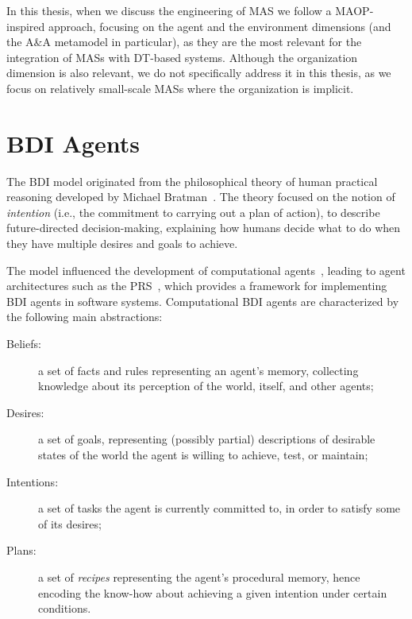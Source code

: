 In this thesis, when we discuss the engineering of \ac{MAS} we follow a \ac{MAOP}-inspired approach, focusing on the agent and the environment dimensions (and the A\&A metamodel in particular), as they are the most relevant for the integration of \acp{MAS} with \ac{DT}-based systems.
%
Although the organization dimension is also relevant, we do not specifically address it in this thesis, as we focus on relatively small-scale \acp{MAS} where the organization is implicit.

\section{\acl{BDI} Agents}
The \ac{BDI} model originated from the philosophical theory of human practical reasoning developed by Michael Bratman~\cite{Bratman1987-BRAIPA}.
%
The theory focused on the notion of \emph{intention} (i.e., the commitment to carrying out a plan of action), to describe future-directed decision-making, explaining how humans decide what to do
when they have multiple desires and goals to achieve.

The model influenced the development of computational agents~\cite{rao1991modeling}, 
leading to agent architectures such as the \ac{PRS}~\cite{Georgeff_Lansky_1986},
which provides a framework for implementing \ac{BDI} agents in software systems.
%
Computational \ac{BDI} agents are characterized by the following main abstractions:
%
\begin{description}
    \item[Beliefs:] a set of facts and rules representing an agent's memory, collecting knowledge about its perception of the world, itself, and other agents;

    \item[Desires:] a set of goals, representing (possibly partial) descriptions of desirable states of the world
    the agent is willing to achieve, test, or maintain;

    \item[Intentions:] a set of tasks the agent is currently committed to, in order to satisfy some of its desires;

    \item[Plans:] a set of \emph{recipes} representing the agent's procedural memory,
    hence encoding the know-how about achieving a given intention under certain conditions.
\end{description}


